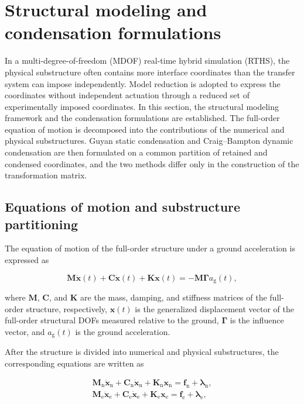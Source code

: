 \documentclass[a4paper,fleqn,review,12pt]{cas-sc}
\numberwithin{equation}{section}
\begin{document}
\section{Structural modeling and condensation formulations} \label{sec2}

In a multi-degree-of-freedom (MDOF) real-time hybrid simulation (RTHS), the physical substructure often contains more interface coordinates than the transfer system can impose independently. Model reduction is adopted to express the coordinates without independent actuation through a reduced set of experimentally imposed coordinates.
In this section, the structural modeling framework and the condensation formulations are established. The full-order equation of motion is decomposed into the contributions of the numerical and physical substructures. Guyan static condensation and Craig--Bampton dynamic condensation are then formulated on a common partition of retained and condensed coordinates, and the two methods differ only in the construction of the transformation matrix.

\subsection{Equations of motion and substructure partitioning}
The equation of motion of the full-order structure under a ground acceleration is expressed as

\vspace{-3.5em}
\begin{equation}
	\mathbf{M}\ddot{\bm{x}}(t)+\mathbf{C}\dot{\bm{x}}(t)+\mathbf{K}\bm{x}(t)
	=-\mathbf{M}\bm{\Gamma}a_{\mathrm{g}}(t),
	\label{eq:full-order-eom}
\end{equation}
\vspace{-3.5em}

\noindent where \(\mathbf{M}\), \(\mathbf{C}\), and \(\mathbf{K}\) are the mass, damping, and stiffness matrices of the full-order structure, respectively, \(\bm{x}(t)\) is the generalized displacement vector of the full-order structural DOFs measured relative to the ground, \(\bm{\Gamma}\) is the influence vector, and \(a_{\mathrm{g}}(t)\) is the ground acceleration.

After the structure is divided into numerical and physical substructures, the corresponding equations are written as

\vspace{-3.5em}
\begin{subequations}
	\label{eq:substructure-eom}
	\begin{align}
		\mathbf{M}_{\mathrm{n}}\ddot{\bm{x}}_{\mathrm{n}}
		+\mathbf{C}_{\mathrm{n}}\dot{\bm{x}}_{\mathrm{n}}
		+\mathbf{K}_{\mathrm{n}}\bm{x}_{\mathrm{n}}
		=\bm{f}_{\mathrm{n}}{}+\bm{\lambda}_{\mathrm{n}},
		\label{eq:numerical-eom}\\
		\mathbf{M}_{\mathrm{e}}\ddot{\bm{x}}_{\mathrm{e}}
		+\mathbf{C}_{\mathrm{e}}\dot{\bm{x}}_{\mathrm{e}}
		+\mathbf{K}_{\mathrm{e}}\bm{x}_{\mathrm{e}}
		=\bm{f}_{\mathrm{e}}{}+\bm{\lambda}_{\mathrm{e}},
		\label{eq:physical-eom}
	\end{align}
\end{subequations}
\vspace{-3.5em}
\end{document}
